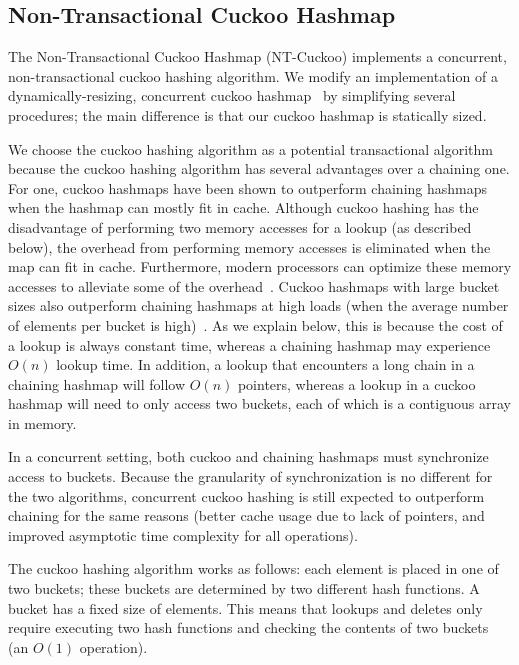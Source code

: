 \subsection{Non-Transactional Cuckoo Hashmap}
\label{section:ntchm_algo}
The Non-Transactional Cuckoo Hashmap (NT-Cuckoo) implements a concurrent, non-transactional cuckoo hashing algorithm. We modify an implementation of a dynamically-resizing, concurrent cuckoo hashmap~\cite{cuckoocode} by simplifying several procedures; the main difference is that our cuckoo hashmap is statically sized.

We choose the cuckoo hashing algorithm as a potential transactional algorithm because the cuckoo hashing algorithm has several advantages over a chaining one. For one, cuckoo hashmaps have been shown to outperform chaining hashmaps when the hashmap can mostly fit in cache. Although cuckoo hashing has the disadvantage of performing two memory accesses for a lookup (as described below), the overhead from performing memory accesses is eliminated when the map can fit in cache.
Furthermore, modern processors can optimize these memory accesses to alleviate some of the overhead~\cite{chm_arch}.
Cuckoo hashmaps with large bucket sizes also outperform chaining hashmaps at high loads (when the average number of elements per bucket is high)~\cite{chm_load}. As we explain below, this is because the cost of a lookup is always constant time, whereas a chaining hashmap may experience $O(n)$ lookup time. In addition, a lookup that encounters a long chain in a chaining hashmap will follow $O(n)$ pointers, whereas a lookup in a cuckoo hashmap will need to only access two buckets, each of which is a contiguous array in memory.

In a concurrent setting, both cuckoo and chaining hashmaps must synchronize access to buckets. Because the granularity of synchronization is no different for the two algorithms, concurrent cuckoo hashing is still expected to outperform chaining for the same reasons (better cache usage due to lack of pointers, and improved asymptotic time complexity for all operations).

The cuckoo hashing algorithm works as follows: each element is placed in one of two buckets; these buckets are determined by two different hash functions. A bucket has a fixed size of elements. This means that lookups and deletes only require executing two hash functions and checking the contents of two buckets (an $O(1)$ operation).


